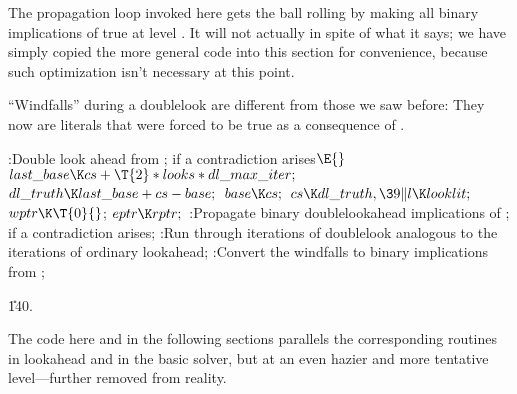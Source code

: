 The propagation loop invoked here gets the ball rolling by making all
binary implications of  true at level . It
will
not actually  in spite of what it says; we have
simply copied the more general code into this section for convenience,
because such optimization isn't necessary at this point.

``Windfalls'' during a doublelook are different from those we saw before:
They now are literals that were forced to be true as a consequence
of .

\Y\B\4:Double look ahead from ; 
if a contradiction arises\X${}\E{}$\6
$\\{last\_base}\K\\{cs}+\T{2}*\\{looks}*\\{dl\_max\_iter};{}$\6
${}\\{dl\_truth}\K\\{last\_base}+\\{cs}-\\{base};{}$\6
${}\\{base}\K\\{cs};{}$\6
${}\\{cs}\K\\{dl\_truth},\39\|l\K\\{looklit};{}$\6
${}\\{wptr}\K\T{0}{}$;\5
${}\\{eptr}\K\\{rptr};{}$\6
:Propagate binary doublelookahead implications of ;  if a contradiction arises\X;\6
:Run through iterations of doublelook analogous to the iterations of
ordinary lookahead\X;\6
:Convert the windfalls to binary implications from \X;\par
\U140.\fi

The code here and in the following sections parallels the
corresponding
routines in lookahead and in the basic solver, but at an even hazier and more
tentative level---further removed from reality.

